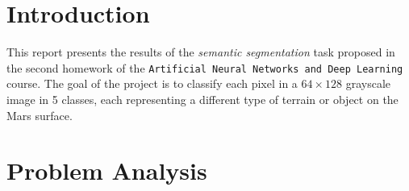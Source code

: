 \documentclass[11pt]{article}
\begin{document}
\begin{multicols}{2}

      \section{Introduction}


      This report presents the results of the \textit{semantic segmentation}\cite{long2015fullyconvolutionalnetworkssemantic}
      task proposed in the second homework of the \texttt{Artificial Neural Networks and Deep Learning} course. The goal of the project is to classify each pixel in a $64\times128$ grayscale image in 5 classes, each representing a different type of terrain or object on the Mars surface.

      \section{Problem Analysis}


\end{multicols}
\end{document}
